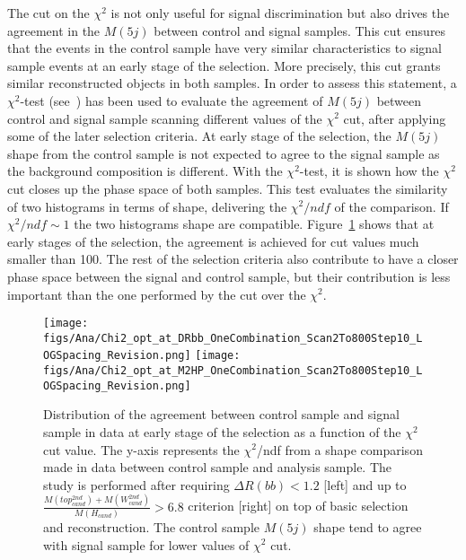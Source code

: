The cut on the $\chi^{2}$ is not only useful for signal discrimination but also drives the agreement in the $M(5j)$ between control and signal samples. This cut ensures that the events in the control sample have very similar characteristics to signal sample events at an early stage of the selection. More precisely, this cut grants similar reconstructed objects in both samples. In order to assess this statement, a $\chi^{2}$-test (see~\cite{2006physics...5123G}) has been used to evaluate the agreement of $M(5j)$ between control and signal sample scanning different values of the $\chi^{2}$ cut, after applying some of the later selection criteria. At early stage of the selection, the $M(5j)$ shape from the control sample is not expected to agree to the signal sample as the background composition is different. With the $\chi^{2}$-test, it is shown how the $\chi^{2}$ cut closes up the phase space of both samples. This test evaluates the similarity of two histograms in terms of shape, delivering the $\chi^{2}/ndf$ of the comparison. If ${\chi^{2}/ndf\sim 1}$ the two histograms shape are compatible. Figure~\ref{fig:optchi2} shows that at early stages of the selection, the agreement is achieved for cut values much smaller than 100. The rest of the selection criteria also contribute to have a closer phase space between the signal and control sample, but their contribution is less important than the one performed by the cut over the $\chi^{2}$.

\begin{figure}[!Hhtbp]
  \begin{center}
    \texttt{[image: figs/Ana/Chi2\_opt\_at\_DRbb\_OneCombination\_Scan2To800Step10\_LOGSpacing\_Revision.png]} %
    \texttt{[image: figs/Ana/Chi2\_opt\_at\_M2HP\_OneCombination\_Scan2To800Step10\_LOGSpacing\_Revision.png]}
    \caption{Distribution of the agreement between control sample and signal sample in data at early stage of the selection as a function of the $\chi^2$ cut value. The y-axis represents the $\chi^{2}$/ndf from a shape comparison made in data between control sample and analysis sample. The study is performed after requiring $\Delta R(bb) <1.2$ [left] and up to $\frac{M(top^{2nd}_{cand})+M(W^{2nd}_{cand})}{M(H_{cand})}>6.8$ criterion [right] on top of basic selection and reconstruction. The control sample $M(5j)$ shape tend to agree with signal sample for lower values of $\chi^2$ cut.}
    \label{fig:optchi2}
  \end{center}
\end{figure}

